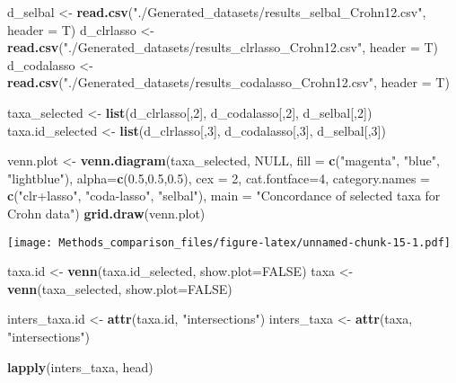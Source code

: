 \documentclass[]{book}
\newenvironment{Shaded}{\begin{snugshade}}{\end{snugshade}}
\newcommand{\KeywordTok}[1]{\textcolor[rgb]{0.13,0.29,0.53}{\textbf{#1}}}
\newcommand{\DataTypeTok}[1]{\textcolor[rgb]{0.13,0.29,0.53}{#1}}
\newcommand{\DecValTok}[1]{\textcolor[rgb]{0.00,0.00,0.81}{#1}}
\newcommand{\FloatTok}[1]{\textcolor[rgb]{0.00,0.00,0.81}{#1}}
\newcommand{\StringTok}[1]{\textcolor[rgb]{0.31,0.60,0.02}{#1}}
\newcommand{\OtherTok}[1]{\textcolor[rgb]{0.56,0.35,0.01}{#1}}
\newcommand{\NormalTok}[1]{#1}
\begin{document}
\begin{Shaded}
\begin{Highlighting}[]
\NormalTok{d_selbal <-}\StringTok{ }\KeywordTok{read.csv}\NormalTok{(}\StringTok{"./Generated_datasets/results_selbal_Crohn12.csv"}\NormalTok{, }\DataTypeTok{header =}\NormalTok{ T)}
\NormalTok{d_clrlasso <-}\StringTok{ }\KeywordTok{read.csv}\NormalTok{(}\StringTok{"./Generated_datasets/results_clrlasso_Crohn12.csv"}\NormalTok{, }\DataTypeTok{header =}\NormalTok{ T)}
\NormalTok{d_codalasso <-}\StringTok{ }\KeywordTok{read.csv}\NormalTok{(}\StringTok{"./Generated_datasets/results_codalasso_Crohn12.csv"}\NormalTok{, }\DataTypeTok{header =}\NormalTok{ T)}
  
\NormalTok{taxa_selected <-}\StringTok{ }\KeywordTok{list}\NormalTok{(d_clrlasso[,}\DecValTok{2}\NormalTok{], d_codalasso[,}\DecValTok{2}\NormalTok{], d_selbal[,}\DecValTok{2}\NormalTok{])}
\NormalTok{taxa.id_selected <-}\StringTok{ }\KeywordTok{list}\NormalTok{(d_clrlasso[,}\DecValTok{3}\NormalTok{], d_codalasso[,}\DecValTok{3}\NormalTok{], d_selbal[,}\DecValTok{3}\NormalTok{])}


\NormalTok{venn.plot <-}\StringTok{ }\KeywordTok{venn.diagram}\NormalTok{(taxa_selected, }\OtherTok{NULL}\NormalTok{, }\DataTypeTok{fill =} \KeywordTok{c}\NormalTok{(}\StringTok{"magenta"}\NormalTok{, }\StringTok{"blue"}\NormalTok{, }\StringTok{"lightblue"}\NormalTok{), }
                          \DataTypeTok{alpha=}\KeywordTok{c}\NormalTok{(}\FloatTok{0.5}\NormalTok{,}\FloatTok{0.5}\NormalTok{,}\FloatTok{0.5}\NormalTok{), }\DataTypeTok{cex =} \DecValTok{2}\NormalTok{, }\DataTypeTok{cat.fontface=}\DecValTok{4}\NormalTok{, }
                          \DataTypeTok{category.names =} \KeywordTok{c}\NormalTok{(}\StringTok{"clr+lasso"}\NormalTok{, }\StringTok{"coda-lasso"}\NormalTok{, }\StringTok{"selbal"}\NormalTok{),}
                          \DataTypeTok{main =} \StringTok{"Concordance of selected taxa for Crohn data"}\NormalTok{)}
\KeywordTok{grid.draw}\NormalTok{(venn.plot)}
\end{Highlighting}
\end{Shaded}

\texttt{[image: Methods\_comparison\_files/figure-latex/unnamed-chunk-15-1.pdf]}

\begin{Shaded}
\begin{Highlighting}[]
\NormalTok{taxa.id <-}\StringTok{ }\KeywordTok{venn}\NormalTok{(taxa.id_selected, }\DataTypeTok{show.plot=}\OtherTok{FALSE}\NormalTok{)}
\NormalTok{taxa <-}\StringTok{ }\KeywordTok{venn}\NormalTok{(taxa_selected, }\DataTypeTok{show.plot=}\OtherTok{FALSE}\NormalTok{)}

\NormalTok{inters_taxa.id <-}\StringTok{ }\KeywordTok{attr}\NormalTok{(taxa.id, }\StringTok{"intersections"}\NormalTok{)}
\NormalTok{inters_taxa <-}\StringTok{ }\KeywordTok{attr}\NormalTok{(taxa, }\StringTok{"intersections"}\NormalTok{)}

\KeywordTok{lapply}\NormalTok{(inters_taxa, head) }
\end{Highlighting}
\end{Shaded}
\end{document}
